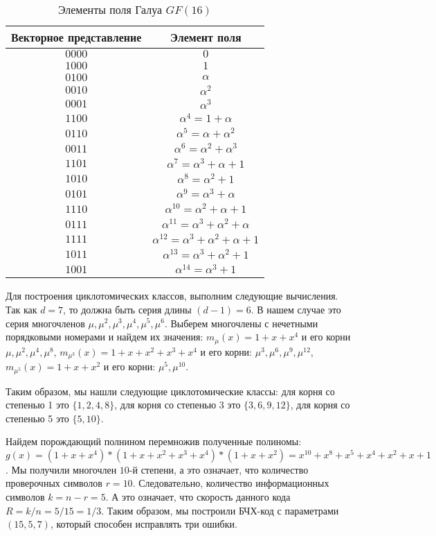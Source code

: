 \begin{table}[htbp]
\caption{\label{tab:GaloisField}Элементы поля Галуа $GF(16)$}
\begin{center}
\begin{tabular}{|c|c|}
\hline
Векторное представление & Элемент поля \\
\hline
$0000$ & $0$ \\
$1000$ & $1$ \\
$0100$ & $\alpha$ \\
$0010$ & $\alpha^2$ \\
$0001$ & $\alpha^3$ \\
$1100$ & $\alpha^4=1+\alpha$ \\
$0110$ & $\alpha^5=\alpha+\alpha^2$ \\
$0011$ & $\alpha^6=\alpha^2+\alpha^3$ \\
$1101$ & $\alpha^7=\alpha^3+\alpha+1$ \\
$1010$ & $\alpha^8=\alpha^2+1$ \\
$0101$ & $\alpha^9=\alpha^3+\alpha$ \\
$1110$ & $\alpha^{10}=\alpha^2+\alpha+1$ \\
$0111$ & $\alpha^{11}=\alpha^3+\alpha^2+\alpha$ \\
$1111$ & $\alpha^{12}=\alpha^3+\alpha^2+\alpha+1$ \\
$1011$ & $\alpha^{13}=\alpha^3+\alpha^2+1$ \\
$1001$ & $\alpha^{14}=\alpha^3+1$ \\
\hline
\end{tabular}
\end{center}
\end{table} 

Для построения циклотомических классов, выполним следующие вычисления.
Так как $d=7$, то должна быть серия длины $(d-1)=6$. В нашем случае это серия многочленов 
$\mu, \mu^2, \mu^3, \mu^4, \mu^5, \mu^6$. Выберем многочлены с нечетными порядковыми номерами
и найдем их значения: 
$m_\mu(x)=1+x+x^4$ и его корни $\mu, \mu^2, \mu^4, \mu^8$,
$m_{\mu^3}(x)=1+x+x^2+x^3+x^4$ и его корни: $\mu^3, \mu^6, \mu^9, \mu^{12}$,
$m_{\mu^5}(x)=1+x+x^2$ и его корни: $\mu^5, \mu^{10}.$

Таким образом, мы нашли следующие циклотомические классы:
для корня со степенью 1 это $\{1, 2, 4, 8\}$,
для корня со степенью 3 это $\{3, 6, 9, 12\}$,
для корня со степенью 5 это $\{5, 10\}$.

Найдем порождающий полнином перемножив полученные полиномы: $g(x)=(1+x+x^4)*(1+x+x^2+x^3+x^4)
*(1+x+x^2)=x^{10}+x^8+x^5+x^4+x^2+x+1$. Мы получили многочлен $10$-й степени, а это означает,
что количество проверочных символов $r=10$. Следовательно, количество информационных
символов $k=n-r=5$. А это означает, что скорость данного кода $R=k/n=5/15=1/3$. Таким образом,
мы построили БЧХ-код с параметрами $(15, 5, 7)$, который способен исправлять три ошибки.


